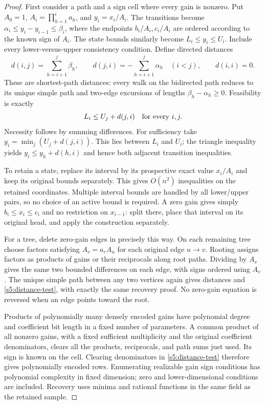 \begin{proof}
First consider a path and a sign cell where every gain is nonzero. Put
$A_0=1$, $A_i=\prod_{h=1}^i a_h$, and $y_i=x_i/A_i$. The transitions
become $\alpha_i\le y_i-y_{i-1}\le\beta_i$, where the endpoints
$b_i/A_i,c_i/A_i$ are ordered according to the known sign of $A_i$.
The state bounds similarly become $L_i\le y_i\le U_i$. Include every
lower-versus-upper consistency condition. Define directed distances
\[
 d(i,j)=\sum_{h=i+1}^j\beta_h,\qquad
 d(j,i)=-\sum_{h=i+1}^j\alpha_h\quad(i<j),\qquad d(i,i)=0.
\]
These are shortest-path distances: every walk on the bidirected path
reduces to its unique simple path and two-edge excursions of lengths
$\beta_h-\alpha_h\ge0$. Feasibility is exactly
\begin{equation}
 L_i\le U_j+d(j,i)\quad\hbox{for every }i,j.
 \label{s5:distance-test}
\end{equation}
Necessity follows by summing differences. For sufficiency take
$y_i=\min_j(U_j+d(j,i))$. This lies between $L_i$ and $U_i$; the
triangle inequality yields $y_i\le y_h+d(h,i)$ and hence both
adjacent transition inequalities.

To retain a state, replace its interval by its prospective exact value
$x_i/A_i$ and keep its original bounds separately. This gives
$O(n^2)$ inequalities on the retained coordinates. Multiple interval
bounds are handled by all lower/upper pairs, so no choice of an active
bound is required. A zero gain gives simply $b_i\le x_i\le c_i$ and
no restriction on $x_{i-1}$: split there, place that interval on its
original head, and apply the construction separately.

For a tree, delete zero-gain edges in precisely this way. On each
remaining tree choose factors satisfying $A_v=a_eA_u$ for each original
edge $u\to v$. Rooting assigns factors as products of gains or their
reciprocals along root paths. Dividing by $A_v$ gives the same two
bounded differences on each edge, with signs ordered using $A_v$.
The unique simple path between any two vertices again gives distances
and \eqref{s5:distance-test}, with exactly the same recovery proof.
No zero-gain equation is reversed when an edge points toward the root.

Products of polynomially many densely encoded gains have polynomial
degree and coefficient bit length in a fixed number of parameters. A common product of
all nonzero gains, with a fixed sufficient multiplicity and the original
coefficient denominators, clears all the products, reciprocals, and
path sums just used. Its sign is known on the cell. Clearing denominators
in \eqref{s5:distance-test} therefore gives polynomially encoded rows.
Enumerating realizable gain sign conditions has polynomial complexity
in fixed dimension; zero and lower-dimensional conditions are included.
Recovery uses minima and rational functions in the same field as the
retained sample.


\end{proof}
